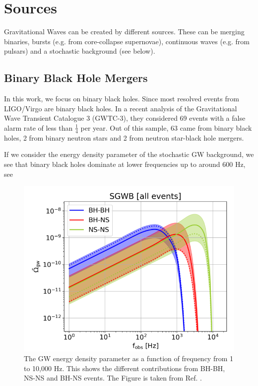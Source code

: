 \section{Sources}
Gravitational Waves can be created by different sources. These can be
merging binaries, bursts (e.g. from core-collapse supernovae), continuous waves 
(e.g. from pulsars) and a stochastic background (see below).

\subsection{Binary Black Hole Mergers}
In this work, we focus on binary black holes. Since most resolved events from LIGO/Virgo are binary black holes. In a recent analysis of the Gravitational Wave Transient Catalogue 3 (GWTC-3), they considered 69 events with a false alarm rate of less than $\frac{1}{4}$ per year. Out of this sample, 63 came from binary black holes, 2 from binary neutron stars and 2 from neutron star-black hole mergers.

If we consider the energy density parameter of the stochastic GW background, we see that binary black holes dominate at lower frequencies up to around 600 Hz, see 

\begin{figure}[h]
    \centering
    \includegraphics[width=0.7\linewidth]{Images/Capurri_GW_Background_monopole_sources.png}
    \caption{The GW energy density parameter as a function of frequency from 1 to 10,000 Hz. This shows the different contributions from BH-BH, NS-NS and BH-NS events. The Figure is taken from Ref. \cite{capurri_intensity_2021}.}
    \label{BG_sources}
\end{figure} 

